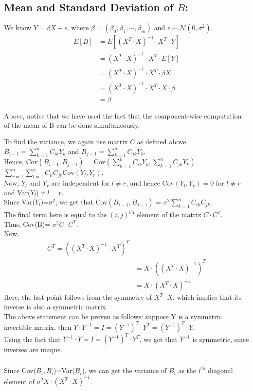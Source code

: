 \subsection{Mean and Standard Deviation of $B$: }
We know $Y=\beta X+\epsilon$, where $\beta=(\beta_0, \beta_1, \cdots, \beta_m)$ and $\epsilon \sim \mathcal{N}(0, \sigma^2)$.\\
\begin{align*}
    E[B] &= E[(X^T\cdot X)^{-1}\cdot X^T\cdot Y]\\
    &= (X^T\cdot X)^{-1}\cdot X^T\cdot E[Y]\\
    &= (X^T\cdot X)^{-1}\cdot X^T\cdot \beta X\\
    &= (X^T\cdot X)^{-1}\cdot X^T\cdot X\cdot \beta \\
    &= \beta
\end{align*}

Above, notice that we have used the fact that the component-wise computation of the mean of B can be done simultaneously.

To find the variance, we again use matrix $C$ as defined above. $B_{i-1}=\sum_{k=1}^{n} C_{ik} Y_k$ and $B_{j-1}=\sum_{k=1}^n C_{jk} Y_k$.\\
Hence, Cov$(B_{i-1}, B_{j-1})$ = Cov$(\sum_{k=1}^{n} C_{ik} Y_k, \sum_{k=1}^{n} C_{jk} Y_k)$ = $\sum_{r=1}^n \sum_{l=1}^n C_{il} C_{jr} \text{Cov}(Y_l, Y_r)$.\\
Now, $Y_l$ and $Y_r$ are independent for $l \neq r$, and hence Cov$(Y_l, Y_r)=0$ for $l \neq r$ and Var($Y_l$) if $l=r$.\\
Since Var($Y_l$)=$\sigma^2$, we get that Cov$(B_{i-1}, B_{j-1})$ = $\sigma^2 \sum_{k=1}^n C_{ik} C_{jk}$.\\
The final term here is equal to the $(i, j)$\textsuperscript{th} element of the matrix $C\cdot C^T$.\\
Thus, Cov(B)= $\sigma^2 C\cdot C^T$.\\
Now, 
\begin{align*}
    C^T=((X^T\cdot X)^{-1}\cdot X^T)^T\\
    &=X\cdot ((X^T\cdot X)^{-1})^T\\
    &=X\cdot (X^T\cdot X)^{-1}
\end{align*}
Here, the last point follows from the symmetry of $X^T\cdot X$, which implies that its inverse is also a symmetric matrix.\\
The above statement can be proven as follows: suppose Y is a symmetric invertible matrix, then $Y\cdot Y^{-1} = I = (Y^{-1})^T\cdot Y^T=(Y^{-1})^T\cdot Y$.\\
Using the fact that $Y^{-1}\cdot Y=I = (Y^{-1})^T\cdot Y^T$, we get that $Y^{-1}$ is symmetric, since inverses are unique.\\
\\
Since Cov($B_i, B_i$)=Var($B_i$), we can get the variance of $B_i$ as the i\textsuperscript{th} diagonal element of $\sigma^2 X\cdot (X^T\cdot X)^{-1}$.\\

